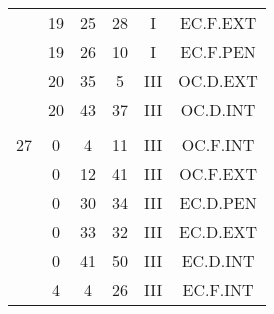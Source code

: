 \documentclass[12pt, a4paper]{article}
\begin{document}
\begin{multicols}{3}
{\begin{tabular}{c c c c c c}
	 	 	 	 & 19 & 25 & 28 & I & EC.F.EXT\\%
	 	 	 	 & 19 & 26 & 10 & I & EC.F.PEN\\%
	 	 	 	 & 20 & 35 & 5 & III & OC.D.EXT\\%
	 	 	 	 & 20 & 43 & 37 & III & OC.D.INT\\%
	 	 	 	 & & & & & \\%
	 	 	 	27 & 0 & 4 & 11 & III & OC.F.INT\\%
	 	 	 	 & 0 & 12 & 41 & III & OC.F.EXT\\%
	 	 	 	 & 0 & 30 & 34 & III & EC.D.PEN\\%
	 	 	 	 & 0 & 33 & 32 & III & EC.D.EXT\\%
	 	 	 	 & 0 & 41 & 50 & III & EC.D.INT\\%
	 	 	 	 & 4 & 4 & 26 & III & EC.F.INT\\%
	 	 \end{tabular}
 	}
\end{multicols}
\end{document}
